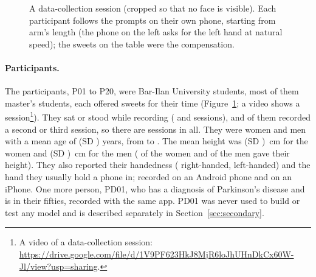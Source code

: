 \begin{figure}[tbp]
\centering
{}
\caption{A data-collection session (cropped so that no face is visible). Each participant follows the prompts on
their own phone, starting from arm's length (the phone on the left asks for the left hand at natural speed); the
sweets on the table were the compensation.}
\label{fig:photo}
\end{figure}

\paragraph{Participants.} The  participants, P01 to P20, were Bar-Ilan University students,
most of them master's students, each offered sweets for their time (Figure~\ref{fig:photo}; a video shows a
session\footnote{\raggedright A video of a data-collection session:
\url{https://drive.google.com/file/d/1V9PF623HkJ8MjR6loJhUHnDkCx60W-Jl/view?usp=sharing}.}). They sat or stood while recording
( and  sessions), and  of
them recorded a second or third session, so there are  sessions in all. They were
 women and  men with a mean age of  (SD
) years, from  to . The mean height was
 (SD )~cm for the women and 
(SD )~cm for the men ( of the  women and
 of the  men gave their height). They also reported their handedness
( right-handed,  left-handed) and the hand they usually hold a
phone in;  recorded on an Android phone and  on an iPhone. One
more person, PD01, who has a diagnosis of Parkinson's disease and is in their fifties, recorded with the same app.
PD01 was never used to build or test any model and is described separately in Section~\ref{sec:secondary}.

